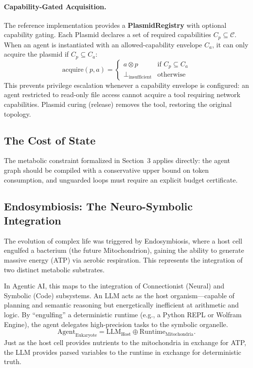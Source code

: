 \paragraph{Capability-Gated Acquisition.}
The reference implementation provides a \textbf{PlasmidRegistry} with optional capability gating. Each Plasmid declares a set of required capabilities $C_p \subseteq \mathcal{C}$. When an agent is instantiated with an allowed-capability envelope $C_a$, it can only acquire the plasmid if $C_p \subseteq C_a$:
\begin{equation}
\mathrm{acquire}(p, a) =
\begin{cases}
a \otimes p & \text{if } C_p \subseteq C_a \\
\bot_{\text{insufficient}} & \text{otherwise}
\end{cases}
\label{eq:capability-gated-acquisition}
\end{equation}
This prevents privilege escalation whenever a capability envelope is configured: an agent restricted to read-only file access cannot acquire a tool requiring network capabilities. Plasmid curing (release) removes the tool, restoring the original topology.

\subsection{The Cost of State}
The metabolic constraint formalized in Section~3 applies directly: the agent graph should be compiled with a conservative upper bound on token consumption, and unguarded loops must require an explicit budget certificate.

\subsection{Endosymbiosis: The Neuro-Symbolic Integration}

The evolution of complex life was triggered by Endosymbiosis, where a host cell engulfed a bacterium (the future
Mitochondrion), gaining the ability to generate massive energy (ATP) via aerobic respiration. This represents the
integration of two distinct metabolic substrates.

In Agentic AI, this maps to the integration of Connectionist (Neural) and Symbolic (Code) subsystems. An LLM acts
as the host organism---capable of planning and semantic reasoning but energetically inefficient at arithmetic and
logic. By ``engulfing'' a deterministic runtime (e.g., a Python REPL or Wolfram Engine), the agent delegates
high-precision tasks to the symbolic organelle.
\begin{equation}
\mathrm{Agent}_{\text{Eukaryote}} = \mathrm{LLM}_{\text{Host}} \oplus \mathrm{Runtime}_{\text{Mitochondria}}.
\label{eq:endosymbiosis}
\end{equation}
Just as the host cell provides nutrients to the mitochondria in exchange for ATP, the LLM provides parsed
variables to the runtime in exchange for deterministic truth.

